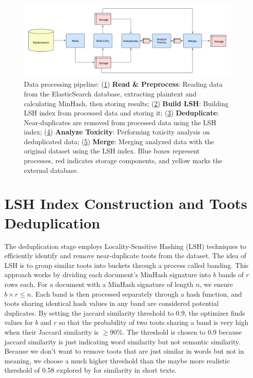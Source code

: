 \begin{figure}[tb]
    \centering
    \includegraphics[width=\textwidth]{../material/pipeline.png}
    \caption{Data processing pipeline: 
    (\hyperref[step:ingestion]{1}) \textbf{Read \& Preprocess}: Reading data from the ElasticSearch database, extracting plaintext and calculating MinHash, then storing results; 
    (\hyperref[step:lsh]{2}) \textbf{Build LSH}: Building LSH index from processed data and storing it; 
    (\hyperref[step:dedup]{3}) \textbf{Deduplicate}: Near-duplicates are removed from processed data using the LSH index; 
    (\hyperref[step:toxicity]{4}) \textbf{Analyze Toxicity}: Performing toxicity analysis on deduplicated data; 
    (\hyperref[step:merge]{5}) \textbf{Merge}: Merging analyzed data with the original dataset using the LSH index. 
    Blue boxes represent processes, red indicates storage components, and yellow marks the external database.}
    \label{fig:pipeline}
\end{figure}

\section{LSH Index Construction and Toots Deduplication}\label{step:lsh_dedup} 
The deduplication stage employs Locality-Sensitive Hashing (LSH) techniques to efficiently identify and remove near-duplicate toots from the dataset. The idea of LSH is to group similar toots into buckets through a process called banding. This approach works by dividing each document's MinHash signature into $b$ bands of $r$ rows each. For a document with a MinHash signature of length $n$, we ensure $b \times r \le n$. Each band is then processed separately through a hash function, and toots sharing identical hash values in any band are considered potential duplicates. By setting the jaccard similarity threshold to 0.9, the optimizer finds values for $b$ and $r$ so that the probability of two toots sharing a band is very high when their Jaccard similarity is $\geq90\%$. The threshold is chosen to 0.9 because jaccard similarity is just indicating word similarity but not semantic similarity. Because we don't want to remove toots that are just similar in words but not in meaning, we choose a much higher threshold than the maybe more realistic threshold of 0.58 explored by \citet{wu:2020} for similarity in short texts.

